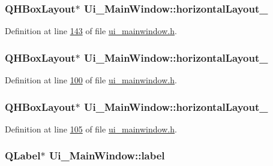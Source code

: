\hypertarget{a00080_a1351e317cba7ca711b6b4d2212b6bf36}{
\subsubsection[{horizontal\+Layout\+\_\+6}]{\setlength{\rightskip}{0pt plus 5cm}Q\+H\+Box\+Layout$\ast$ Ui\+\_\+\+Main\+Window\+::horizontal\+Layout\+\_}}\label{a00080_a1351e317cba7ca711b6b4d2212b6bf36}


Definition at line \hyperlink{a00139_source_l00143}{143} of file \hyperlink{a00139_source}{ui\+\_\+mainwindow.\+h}.

\hypertarget{a00080_a8ead8fc876ee91c30864822eedb9c370}{
\subsubsection[{horizontal\+Layout\+\_\+8}]{\setlength{\rightskip}{0pt plus 5cm}Q\+H\+Box\+Layout$\ast$ Ui\+\_\+\+Main\+Window\+::horizontal\+Layout\+\_}}\label{a00080_a8ead8fc876ee91c30864822eedb9c370}


Definition at line \hyperlink{a00139_source_l00100}{100} of file \hyperlink{a00139_source}{ui\+\_\+mainwindow.\+h}.

\hypertarget{a00080_ab48e49d68609b4c66e5169e2f87e3eb9}{
\subsubsection[{horizontal\+Layout\+\_\+9}]{\setlength{\rightskip}{0pt plus 5cm}Q\+H\+Box\+Layout$\ast$ Ui\+\_\+\+Main\+Window\+::horizontal\+Layout\+\_}}\label{a00080_ab48e49d68609b4c66e5169e2f87e3eb9}


Definition at line \hyperlink{a00139_source_l00105}{105} of file \hyperlink{a00139_source}{ui\+\_\+mainwindow.\+h}.

\hypertarget{a00080_ad9c89133780f28e6efa2ec17ceb9cff5}{
\subsubsection[{label}]{\setlength{\rightskip}{0pt plus 5cm}Q\+Label$\ast$ Ui\+\_\+\+Main\+Window\+::label}}\label{a00080_ad9c89133780f28e6efa2ec17ceb9cff5}


